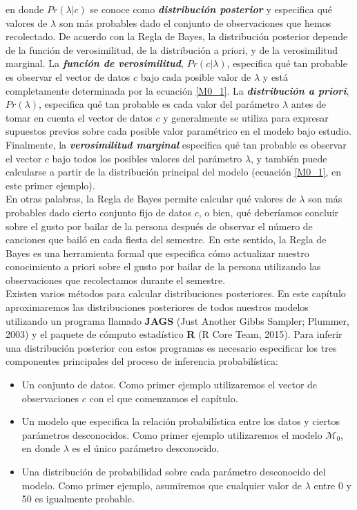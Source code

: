 \documentclass{article}
\begin{document}
\noindent en donde $Pr(\lambda|c)$ se conoce como \emph{\textbf{distribución posterior}} y especifica qué valores de $\lambda$ son más probables dado el conjunto de observaciones que hemos recolectado. De acuerdo con la Regla de Bayes, la distribución posterior depende de la función de verosimilitud, de la distribución  a priori, y de la verosimilitud marginal. La \emph{\textbf{función de verosimilitud}}, $Pr(c|\lambda)$, especifica qué tan probable es observar el vector de datos $c$ bajo cada posible valor de $\lambda$ y está completamente determinada por la ecuación \eqref{M0_1}. La \emph{\textbf{distribución a priori}}, $Pr(\lambda)$, especifica qué tan probable es cada valor del parámetro $\lambda$ antes de tomar en cuenta el vector de datos $c$ y generalmente se utiliza para expresar supuestos previos sobre cada posible valor paramétrico en el modelo bajo estudio. Finalmente, la \emph{\textbf{verosimilitud marginal}} especifica qué tan probable es observar el vector $c$ bajo todos los posibles valores del parámetro $\lambda$, y también puede calcularse a partir de la distribución principal del modelo (ecuación \eqref{M0_1}, en este primer ejemplo). \\
\indent En otras palabras, la Regla de Bayes permite calcular qué valores de $\lambda$ son más probables dado cierto conjunto fijo de datos $c$, o bien, qué deberíamos concluir sobre el gusto por bailar de la persona después de observar el número de canciones que bailó en cada fiesta del semestre. En este sentido, la Regla de Bayes es una herramienta formal que especifica cómo actualizar nuestro conocimiento a priori sobre el gusto por bailar de la persona utilizando las observaciones que recolectamos durante el semestre.\\
\indent Existen varios métodos para calcular distribuciones posteriores. En este capítulo aproximaremos las distribuciones posteriores de todos nuestros modelos utilizando un programa llamado \textbf{JAGS} (Just Another Gibbs Sampler; Plummer, 2003) y el paquete de cómputo estadístico \textbf{R} (R Core Team, 2015). Para inferir una distribución posterior con estos programas es necesario especificar los tres componentes principales del proceso de inferencia probabilística:
\begin{itemize}
\item{Un conjunto de datos. Como primer ejemplo utilizaremos el vector de observaciones $c$ con el que comenzamos el capítulo.}
\item{Un modelo que especifica la relación probabilística entre los datos y ciertos parámetros desconocidos. Como primer ejemplo utilizaremos el modelo $\mathcal M_0$, en donde $\lambda$ es el único parámetro desconocido.}
\item{Una distribución de probabilidad sobre cada parámetro desconocido del modelo. Como primer ejemplo, asumiremos que cualquier valor de $\lambda$ entre 0 y 50 es igualmente probable.}
\end{itemize}
\end{document}
